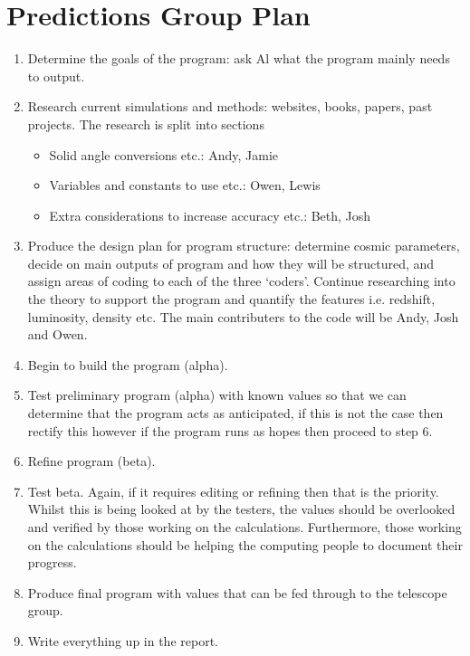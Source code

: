 \section{Predictions Group Plan} %
\label{sec:predictions_plan}
\begin{enumerate}
	\item Determine the goals of the program: ask Al what the program mainly needs to output.
	\item Research current simulations and methods: websites, books, papers, past projects. The research is split into sections
		\begin{itemize}
			\item Solid angle conversions etc.: Andy, Jamie
			\item Variables and constants to use etc.: Owen, Lewis
			\item Extra considerations to increase accuracy etc.: Beth, Josh
		\end{itemize}
	\item Produce the design plan for program structure: determine cosmic parameters, decide on main outputs of program and how they will be structured, and assign areas of coding to each of the three ‘coders’. Continue researching into the theory to support the program and quantify the features i.e. redshift, luminosity, density etc. The main contributers to the code will be Andy, Josh and Owen.
	\item Begin to build the program (alpha).
	\item Test preliminary program (alpha) with known values so that we can determine that the program acts as anticipated, if this is not the case then rectify this however if the program runs as hopes then proceed to step 6. 
	\item Refine program (beta).
	\item Test beta. Again, if it requires editing or refining then that is the priority. Whilst this is being looked at by the testers, the values should be overlooked and verified by those working on the calculations. Furthermore, those working on the calculations should be helping the computing people to document their progress. 
	\item Produce final program with values that can be fed through to the telescope group. 
	\item Write everything up in the report. 
\end{enumerate}

